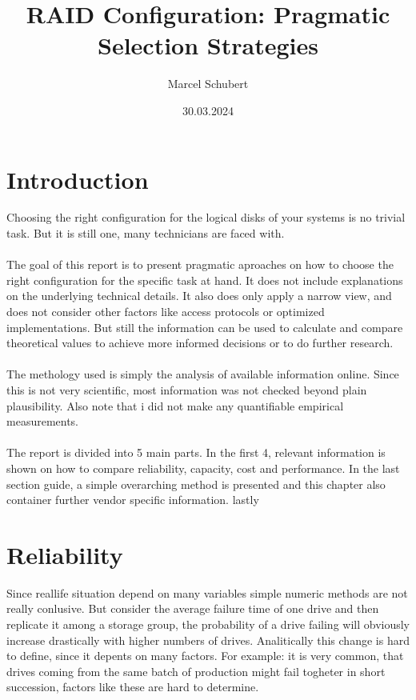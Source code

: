 \documentclass{article}
\title{RAID Configuration: Pragmatic Selection Strategies}
\author{Marcel Schubert}
\date{30.03.2024}
\begin{document}
\maketitle

\section*{Introduction}
Choosing the right configuration for the logical disks
of your systems is no trivial task. But it is still one, many technicians are faced with. 
\\ \\
The goal of this report is to present pragmatic aproaches on
how to choose the right configuration for the specific task at hand. 
It does not include explanations on the underlying technical details.
It also does only apply a narrow view, and does not consider 
other factors like access protocols or optimized implementations.
But still the information can be used to calculate and compare theoretical values
to achieve more informed decisions or to do further research.
\\ \\
The methology used is simply the analysis of available information online.
Since this is not very scientific, most information was
not checked beyond plain plausibility. Also note that i did not 
make any quantifiable empirical measurements.
\\ \\
The report is divided into 5 main parts.
In the first 4, relevant information is shown
on how to compare reliability, capacity, cost and performance.
In the last section guide, a simple overarching method is presented
and this chapter also container further vendor specific information.
lastly 


\pagebreak
\tableofcontents
\pagebreak

\section{Reliability}
Since reallife situation depend on many
variables simple numeric methods are not really conlusive.
But consider the average failure time of one drive and then replicate it among
a storage group, the probability of a drive failing will obviously increase drastically
with higher numbers of drives. Analitically this change is hard to define,
since it depents on many factors. For example: it is very common,
that drives coming from the same batch of production might fail togheter
in short succession, factors like these are hard to determine. \cite{cmu:raidhighperf}
\end{document}
